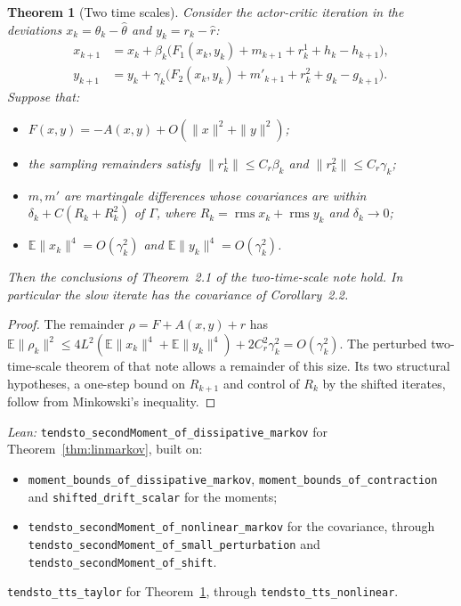 \documentclass[11pt]{article}
\newtheorem{theorem}{Theorem}[section]
\theoremstyle{definition}
\theoremstyle{remark}
\newcommand{\E}{\mathbb{E}}
\begin{document}
\begin{theorem}[Two time scales]\label{thm:lintts}
Consider the actor-critic iteration in the deviations $x_k = \theta_k - \hat\theta$ and $y_k = r_k - \hat r$:
\begin{align*}
  x_{k+1} &= x_k + \beta_k\big(F_1(x_k,y_k) + m_{k+1} + r^1_k + h_k - h_{k+1}\big),\\
  y_{k+1} &= y_k + \gamma_k\big(F_2(x_k,y_k) + m'_{k+1} + r^2_k + g_k - g_{k+1}\big).
\end{align*}
Suppose that:
\begin{itemize}
\item $F(x,y) = -A(x,y) + O(\|x\|^2 + \|y\|^2)$;
\item the sampling remainders satisfy $\|r^1_k\| \le C_r\beta_k$ and $\|r^2_k\| \le C_r\gamma_k$;
\item $m, m'$ are martingale differences whose covariances are within $\delta_k + C(R_k + R_k^2)$ of
  $\Gamma$, where $R_k = \operatorname{rms}x_k + \operatorname{rms}y_k$ and $\delta_k \to 0$;
\item $\E\|x_k\|^4 = O(\gamma_k^2)$ and $\E\|y_k\|^4 = O(\gamma_k^2)$.
\end{itemize}
Then the conclusions of Theorem~2.1 of the two-time-scale note hold. In particular the slow iterate
has the covariance of Corollary~2.2.
\end{theorem}
\begin{proof}
The remainder $\rho = F + A(x,y) + r$ has $\E\|\rho_k\|^2 \le 4L^2(\E\|x_k\|^4 + \E\|y_k\|^4) + 2C_r^2\gamma_k^2 = O(\gamma_k^2)$.
The perturbed two-time-scale theorem of that note allows a remainder of this size. Its two structural
hypotheses, a one-step bound on $R_{k+1}$ and control of $R_k$ by the shifted iterates, follow from
Minkowski's inequality.
\end{proof}
\noindent\emph{Lean:} \texttt{tendsto\_secondMoment\_of\_dissipative\_markov} for
Theorem~\ref{thm:linmarkov}, built on:
\begin{itemize}
\item \texttt{moment\_bounds\_of\_dissipative\_markov}, \texttt{moment\_bounds\_of\_contraction} and
  \texttt{shifted\_drift\_scalar} for the moments;
\item \texttt{tendsto\_secondMoment\_of\_nonlinear\_markov} for the covariance, through
  \texttt{tendsto\_secondMoment\_of\_small\_perturbation} and \texttt{tendsto\_secondMoment\_of\_shift}.
\end{itemize}
\texttt{tendsto\_tts\_taylor} for Theorem~\ref{thm:lintts}, through \texttt{tendsto\_tts\_nonlinear}.
\end{document}
